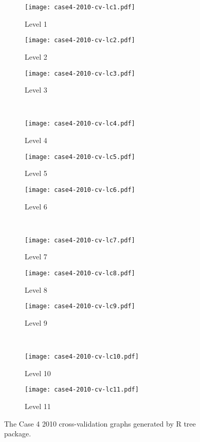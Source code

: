 \begin{appendices}
\begin{figure}[!ht] \centering
	\captionsetup[subfigure]{width=2.0in}
	\begin{subfigure}[t]{0.32\textwidth}
		\texttt{[image: case4-2010-cv-lc1.pdf]}
		\caption{Level 1}
	\end{subfigure}
	\begin{subfigure}[t]{0.32\textwidth}
		\texttt{[image: case4-2010-cv-lc2.pdf]}
		\caption{Level 2}
	\end{subfigure}
	\begin{subfigure}[t]{0.32\textwidth}
		\texttt{[image: case4-2010-cv-lc3.pdf]}
		\caption{Level 3}
	\end{subfigure}\\
	\vspace{5pt}
	\begin{subfigure}[t]{0.32\textwidth}
		\texttt{[image: case4-2010-cv-lc4.pdf]}
		\caption{Level 4}
	\end{subfigure}
	\begin{subfigure}[t]{0.32\textwidth}
		\texttt{[image: case4-2010-cv-lc5.pdf]}
		\caption{Level 5}
	\end{subfigure}
	\begin{subfigure}[t]{0.32\textwidth}
		\texttt{[image: case4-2010-cv-lc6.pdf]}
		\caption{Level 6}
	\end{subfigure}\\
	\vspace{5pt}	
	\begin{subfigure}[t]{0.32\textwidth}
		\texttt{[image: case4-2010-cv-lc7.pdf]}
		\caption{Level 7}
	\end{subfigure}
	\begin{subfigure}[t]{0.32\textwidth}
		\texttt{[image: case4-2010-cv-lc8.pdf]}
		\caption{Level 8}
	\end{subfigure}
	\begin{subfigure}[t]{0.32\textwidth}
		\texttt{[image: case4-2010-cv-lc9.pdf]}
		\caption{Level 9}
	\end{subfigure}\\
	\vspace{5pt}
	\begin{subfigure}[t]{0.32\textwidth}
		\texttt{[image: case4-2010-cv-lc10.pdf]}
		\caption{Level 10}
	\end{subfigure}
	\begin{subfigure}[t]{0.32\textwidth}
		\texttt{[image: case4-2010-cv-lc11.pdf]}
		\caption{Level 11}
	\end{subfigure}
	\vspace{5pt}
	\caption[The Case 4 2010 cross-validation graphs generated by R tree package.]{The Case 4 2010 cross-validation graphs generated by R tree package.}
	\label{fig: appendix-fig.c32.cv}
\end{figure}


\end{appendices}

